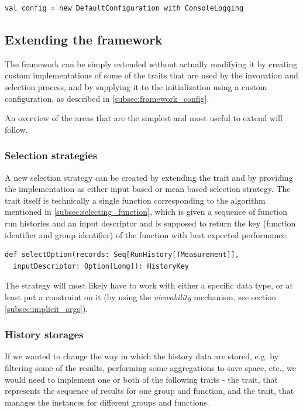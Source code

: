 \lstset{style=Scala}
\begin{lstlisting}
val config = new DefaultConfiguration with ConsoleLogging
\end{lstlisting}

\subsection{Extending the framework}

The framework can be simply extended without actually modifying it by creating custom implementations of some of the traits that are used by the invocation and selection process, and by supplying it to the  initialization using a custom configuration, as described in \ref{subsec:framework_config}.

An overview of the areas that are the simplest and most useful to extend will follow.

\subsubsection{Selection strategies}

A new selection strategy can be created by extending the  trait and by providing the implementation as either input based or mean based selection strategy. The trait itself is technically a single function corresponding to the algorithm mentioned in \ref{subsec:selecting_function}, which is given a sequence of function run histories and an input descriptor and is supposed to return the key (function identifier and group identifier) of the function with best expected performance:

\lstset{style=Scala}
\begin{lstlisting}
def selectOption(records: Seq[RunHistory[TMeasurement]], 
  inputDescriptor: Option[Long]): HistoryKey
\end{lstlisting}

The strategy will most likely have to work with either a specific  data type, or at least put a constraint on it (by using the \textit{viewability} mechanism, see section \ref{subsec:implicit_args}).

\subsubsection{History storages}

If we wanted to change the way in which the history data are stored, e.g. by filtering some of the results, performing some aggregations to save space, etc., we would need to implement one or both of the following traits - the  trait, that represents the sequence of results for one group and function, and the  trait, that manages the  instances for different groups and functions.

